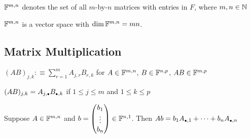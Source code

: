 \begin{mydef}
  $\mathbb{F}^{m,n}$ denotes the set of all $m$-by-$n$ matrices with entries in $F$, where $m,n \in \mathbb{N}$
\end{mydef}

\begin{thm}
  $\mathbb{F}^{m,n}$ is a vector space with $\dim \mathbb{F}^{m,n}=mn$.
\end{thm}


\subsection{Matrix Multiplication}
\setcounter{thm}{40}

\begin{mydef}
  $(AB)_{j,k} :\equiv \sum_{r=1}^{m} A_{j,r} B_{r,k}$ for $A\in \mathbb{F}^{m,n}$, $B\in \mathbb{F}^{n,p}$, $AB \in \mathbb{F}^{m,p}$
\end{mydef}

\setcounter{thm}{45}
\begin{thm}
  $(AB)_{j,k} = A_{j, \mathsmaller{\bullet}} B_{\mathsmaller{\bullet}, k}$ if $1 \leq j \leq m$ and $1 \leq k \leq p$
\end{thm}

\setcounter{thm}{49}
\begin{thm}
  Suppose $A \in \mathbb{F}^{m,n}$ and $b=\left(\begin{matrix}b_1\\ \vdots \\ b_n \end{matrix}\right) \in \mathbb{F}^{n,1}$. Then $Ab = b_1 A_{\mathsmaller{\bullet}, 1} + \dots + b_n A_{\mathsmaller{\bullet},n}$
\end{thm}